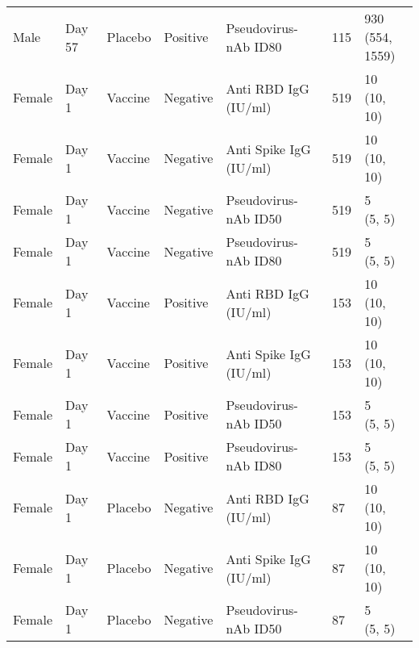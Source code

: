 \documentclass[]{book}
\theoremstyle{definition}
\theoremstyle{definition}
\theoremstyle{definition}
\newcommand{\1}{\mathbbm{1}}
\begin{document}
\begin{landscape}
\begin{ThreePartTable}
\begin{longtable}[t]{>{\raggedright\arraybackslash}p{7cm}llllll}
\hspace{1em}Male & Day 57 & Placebo & Positive & Pseudovirus-nAb ID80 & 115 & \makecell[l]{930\\(554, 1559)}\\
\hspace{1em}Female & Day 1 & Vaccine & Negative & Anti RBD IgG (IU/ml) & 519 & \makecell[l]{10\\(10, 10)}\\
\hspace{1em}Female & Day 1 & Vaccine & Negative & Anti Spike IgG (IU/ml) & 519 & \makecell[l]{10\\(10, 10)}\\
\hspace{1em}Female & Day 1 & Vaccine & Negative & Pseudovirus-nAb ID50 & 519 & \makecell[l]{5\\(5, 5)}\\
\hspace{1em}Female & Day 1 & Vaccine & Negative & Pseudovirus-nAb ID80 & 519 & \makecell[l]{5\\(5, 5)}\\
\hspace{1em}Female & Day 1 & Vaccine & Positive & Anti RBD IgG (IU/ml) & 153 & \makecell[l]{10\\(10, 10)}\\
\hspace{1em}Female & Day 1 & Vaccine & Positive & Anti Spike IgG (IU/ml) & 153 & \makecell[l]{10\\(10, 10)}\\
\hspace{1em}Female & Day 1 & Vaccine & Positive & Pseudovirus-nAb ID50 & 153 & \makecell[l]{5\\(5, 5)}\\
\hspace{1em}Female & Day 1 & Vaccine & Positive & Pseudovirus-nAb ID80 & 153 & \makecell[l]{5\\(5, 5)}\\
\hspace{1em}Female & Day 1 & Placebo & Negative & Anti RBD IgG (IU/ml) & 87 & \makecell[l]{10\\(10, 10)}\\
\hspace{1em}Female & Day 1 & Placebo & Negative & Anti Spike IgG (IU/ml) & 87 & \makecell[l]{10\\(10, 10)}\\
\hspace{1em}Female & Day 1 & Placebo & Negative & Pseudovirus-nAb ID50 & 87 & \makecell[l]{5\\(5, 5)}\\

\end{longtable}
\end{ThreePartTable}
\end{landscape}
\end{document}
